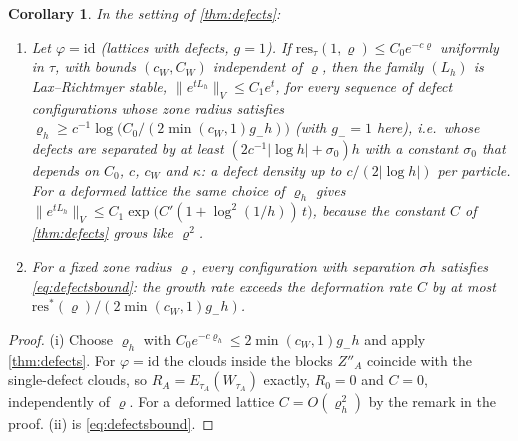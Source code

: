 \documentclass[11pt,a4paper]{article}
\theoremstyle{plain}
\newtheorem{corollary}[theorem]{Corollary}
\theoremstyle{definition}
\theoremstyle{remark}
\numberwithin{equation}{section}
\newcommand{\res}{\mathrm{res}}
\begin{document}
\begin{corollary}\label{cor:defects}
In the setting of \cref{thm:defects}:
\begin{enumerate}[label=(\roman*)]
\item Let $\varphi=\mathrm{id}$ (lattices with defects, $g=1$). If $\res_\tau(1,\varrho)\le C_0e^{-c\varrho}$ uniformly in $\tau$, with bounds $(c_W,C_W)$ independent of $\varrho$, then the family $(L_h)$ is Lax--Richtmyer stable, $\|e^{tL_h}\|_V\le C_1e^{t}$, for every sequence of defect configurations whose zone radius satisfies $\varrho_h\ge c^{-1}\log\big(C_0/(2\min(c_W,1)g_-h)\big)$ (with $g_-=1$ here), i.e.\ whose defects are separated by at least $(2c^{-1}|\log h|+\sigma_0)h$ with a constant $\sigma_0$ that depends on $C_0$, $c$, $c_W$ and $\kappa$: a defect density up to $c/(2|\log h|)$ per particle. For a deformed lattice the same choice of $\varrho_h$ gives $\|e^{tL_h}\|_V\le C_1\exp\big(C'(1+\log^2(1/h))\,t\big)$, because the constant $C$ of \cref{thm:defects} grows like $\varrho^2$.
\item For a fixed zone radius $\varrho$, every configuration with separation $\sigma h$ satisfies \eqref{eq:defectsbound}: the growth rate exceeds the deformation rate $C$ by at most $\res^*(\varrho)/(2\min(c_W,1)g_-h)$.
\end{enumerate}
\end{corollary}

\begin{proof}
(i) Choose $\varrho_h$ with $C_0e^{-c\varrho_h}\le2\min(c_W,1)g_-h$ and apply \cref{thm:defects}. For $\varphi=\mathrm{id}$ the clouds inside the blocks $Z''_A$ coincide with the single-defect clouds, so $R_A=E_{\tau_A}(W_{\tau_A})$ exactly, $R_0=0$ and $C=0$, independently of $\varrho$. For a deformed lattice $C=O(\varrho_h^2)$ by the remark in the proof. (ii) is \eqref{eq:defectsbound}.
\end{proof}
\end{document}
